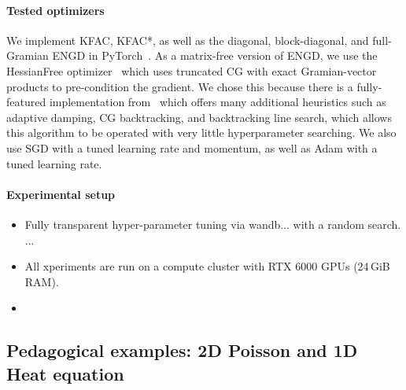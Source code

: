 


\paragraph{Tested optimizers}
We implement KFAC, KFAC*, as well as the diagonal, block-diagonal, and full-Gramian ENGD in PyTorch~\citep{paszke2019pytorch}.
As a matrix-free version of ENGD, we use the HessianFree optimizer~\citep{?} which uses truncated CG with exact Gramian-vector products to pre-condition the gradient.
We chose this because there is a fully-featured implementation from~\citet{tatzel2022late} which offers many additional heuristics such as adaptive damping, CG backtracking, and backtracking line search, which allows this algorithm to be operated with very little hyperparameter searching.
We also use SGD with a tuned learning rate and momentum, as well as Adam with a tuned learning rate.

\paragraph{Experimental setup}
\begin{itemize}
\item Fully transparent hyper-parameter tuning via wandb... with a random search. ... 
\item All xperiments are run on a compute cluster with RTX 6000 GPUs (24\,GiB RAM).
\item 
\end{itemize}


\subsection{Pedagogical examples: 2D Poisson and 1D Heat equation}

